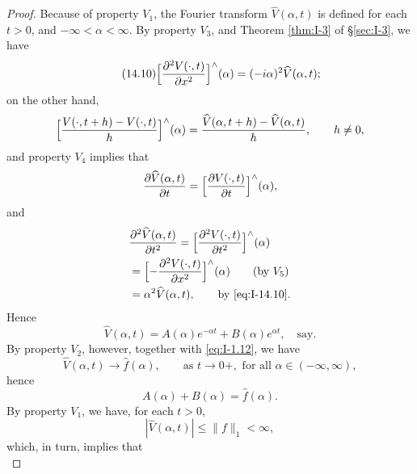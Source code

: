 \begin{proof}
Because of property $V_1$, the Fourier transform $\widehat V(\alpha,t)$ is defined for each $t>0$, and $-\infty<\alpha<\infty$. By property $V_3$, and Theorem \ref{thm:I-3} of \S\ref{sec:I-3}, we have
\begin{equation}\label{eq:I-14.10}\tag{14.10}
\Bigl[\frac{\partial^{2}V(\cdot,t)}{\partial x^{2}}\Bigr]^{\wedge}(\alpha)=(-i\alpha)^{2}\widehat V(\alpha,t);
\end{equation}
on the other hand,
\begin{equation*}
\Bigl[\frac{V(\cdot,t+h)-V(\cdot,t)}{h}\Bigr]^{\wedge}(\alpha)
=\frac{\widehat V(\alpha,t+h)-\widehat V(\alpha,t)}{h},\qquad h\neq 0,
\end{equation*}
and property $V_4$ implies that
\begin{equation*}
\frac{\partial\widehat V(\alpha,t)}{\partial t}
=\Bigl[\frac{\partial V(\cdot,t)}{\partial t}\Bigr]^{\wedge}(\alpha),
\end{equation*}
and
\begin{equation*}
\begin{aligned}
&\frac{\partial^{2}\widehat V(\alpha,t)}{\partial t^{2}} = \Bigl[\frac{\partial^{2}V(\cdot,t)}{\partial t^{2}}\Bigr]^{\wedge}(\alpha)\\
&= \Bigl[-\frac{\partial^{2}V(\cdot,t)}{\partial x^{2}}\Bigr]^{\wedge}(\alpha)\qquad\text{(by }V_5)\\
&= \alpha^{2}\widehat V(\alpha,t),\qquad\text{by \eqref{eq:I-14.10}}.
\end{aligned}
\end{equation*}
Hence
\begin{equation}\label{eq:I-14.11}\tag{14.11}
\widehat V(\alpha,t)=A(\alpha)e^{-\alpha t}+B(\alpha)e^{\alpha t},\quad\text{say}.
\end{equation}
By property $V_2$, however, together with \eqref{eq:I-1.12}, we have
\begin{equation*}
\widehat V(\alpha,t)\to\widehat f(\alpha),\qquad\text{as }t\to 0+,\text{ for all }\alpha\in(-\infty,\infty),
\end{equation*}
hence
\begin{equation*}
A(\alpha)+B(\alpha)=\widehat f(\alpha).
\end{equation*}
By property $V_1$, we have, for each $t>0$,
\begin{equation*}
|\widehat V(\alpha,t)|\le\|f\|_1<\infty,
\end{equation*}
which, in turn, implies that
\begin{equation*}

\end{equation*}
\end{proof}
